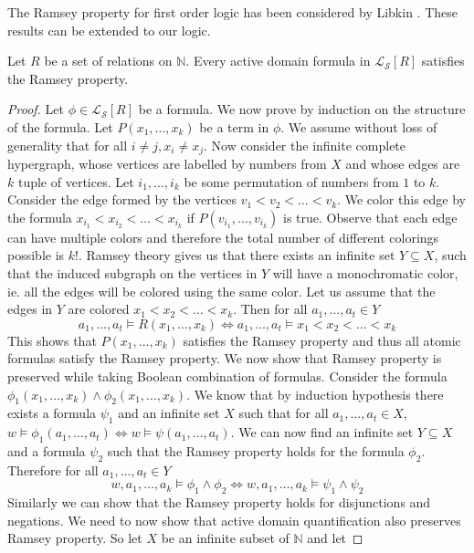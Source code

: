 \documentclass[envcountsame]{llncs}
\begin{document}
The Ramsey property for first order logic has been considered by Libkin \cite{libkin_FMT}. These results can be extended
to our logic.

\begin{theorem}
\label{thm_ramsey}
Let $R$ be a set of relations on $\mathbb{N}$. Every active domain formula in $\mathcal{L_S}[R]$ satisfies 
the Ramsey property.
\end{theorem}
\begin{proof}
  Let $\phi \in \mathcal{L_S}[R]$ be a formula. We now prove by induction on the structure of the formula.
  Let $P(x_1,\dots,x_k)$ be a term in $\phi$. We assume without loss of generality that for all $i \neq j, x_i \neq x_j$.
  Now consider the infinite complete hypergraph, whose vertices are labelled by numbers from $X$ and whose edges are $k$ tuple of vertices.
 Let $i_1,\dots,i_k$ be some permutation of numbers from $1$ to $k$. Consider the edge formed by the vertices $v_1<v_2<\dots<v_k$. 
 We color this edge by the formula $x_{i_1}<x_{i_2}<\dots<x_{i_k}$ if $P(v_{i_1},\dots,v_{i_k})$ is true. Observe that each edge can
 have multiple colors and therefore the total number of different colorings possible is $k!$. Ramsey theory gives us that there exists
 an infinite set $Y \subseteq X$, such that the induced subgraph on the vertices in $Y$ will have a monochromatic color, ie. all the
 edges will be colored using the same color. Let us assume that the edges in $Y$ are colored $x_1<x_2<\dots<x_k$. Then for all
 $a_1,\dots,a_t \in Y$
 $$a_1,\dots,a_t \models R(x_1,\dots,x_k) \Leftrightarrow a_1,\dots,a_t \models x_1<x_2<\dots<x_k$$
This shows that $P(x_1,\dots,x_k)$ satisfies the Ramsey property and thus all atomic formulas satisfy the Ramsey property.
We now show that Ramsey property is preserved while taking Boolean combination of formulas. Consider the formula $\phi_1(x_1,\dots,x_k)
\wedge \phi_2(x_1,\dots,x_k)$. We know that by induction hypothesis there exists a formula $\psi_1$ and an infinite set $X$ such that
for all $a_1,\dots,a_t \in X$, $w \models \phi_1(a_1,\dots,a_t) \Leftrightarrow w \models \psi(a_1,\dots,a_t)$. We can now find an
infinite set $Y \subseteq X$ and a formula $\psi_2$ such that the Ramsey property holds for the formula $\phi_2$. Therefore for all
$a_1,\dots,a_t \in Y$
$$w,a_1,\dots,a_k \vDash \phi_1 \wedge \phi_2 \Leftrightarrow w,a_1,\dots,a_k \vDash \psi_1 \wedge \psi_2$$ 
Similarly we can show that the Ramsey property holds for disjunctions and negations.
We need to now show that active domain quantification also preserves
Ramsey property. So let $X$ be an infinite subset of $\mathbb N$ and let

\end{proof}
\end{document}
